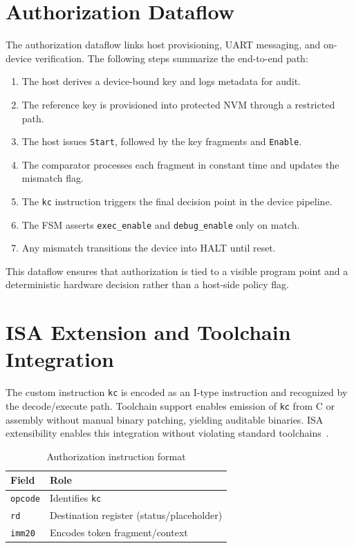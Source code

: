 \section{Authorization Dataflow}
The authorization dataflow links host provisioning, UART messaging, and on-device
verification. The following steps summarize the end-to-end path:
\begin{enumerate}
  \item The host derives a device-bound key and logs metadata for audit.
  \item The reference key is provisioned into protected NVM through a restricted path.
  \item The host issues \texttt{Start}, followed by the key fragments and \texttt{Enable}.
  \item The comparator processes each fragment in constant time and updates the mismatch flag.
  \item The \texttt{kc} instruction triggers the final decision point in the device pipeline.
  \item The FSM asserts \texttt{exec\_enable} and \texttt{debug\_enable} only on match.
  \item Any mismatch transitions the device into \textsf{HALT} until reset.
\end{enumerate}
This dataflow ensures that authorization is tied to a visible program point and a
deterministic hardware decision rather than a host-side policy flag.

\section{ISA Extension and Toolchain Integration}
The custom instruction \texttt{kc} is encoded as an I-type instruction and recognized by
the decode/execute path. Toolchain support enables emission of \texttt{kc} from C or
assembly without manual binary patching, yielding auditable binaries. ISA extensibility
enables this integration without violating standard toolchains~\cite{waterman2014riscv}.

\begin{table}[H]
  \centering
  \caption{Authorization instruction format}
  \label{tab:kc-format}
  \begin{tabular}{@{}p{3.2cm}p{6.8cm}@{}}
    \toprule
    \textbf{Field} & \textbf{Role} \\
    \midrule
    \texttt{opcode} & Identifies \texttt{kc} \\
    \texttt{rd} & Destination register (status/placeholder) \\
    \texttt{imm20} & Encodes token fragment/context \\
    \bottomrule
  \end{tabular}
\end{table}

